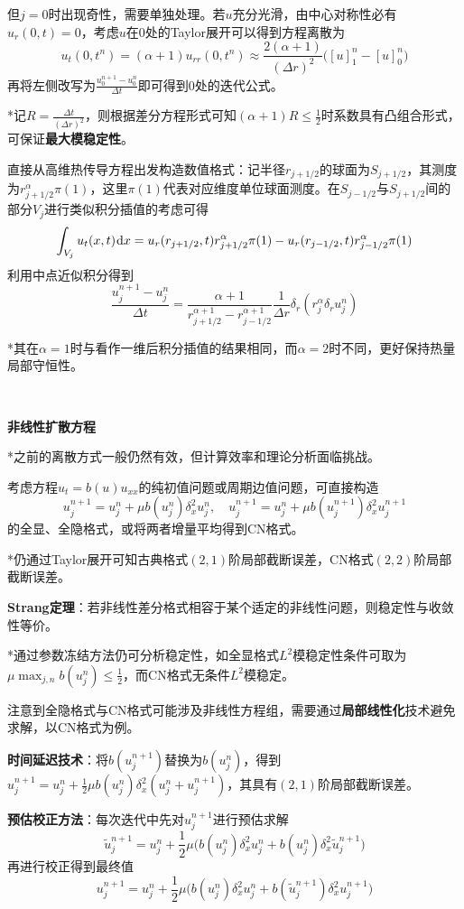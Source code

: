 \documentclass[a4paper,UTF8,fontset=windows]{ctexart}
\newcommand*{\dr}{\hspace{0.07em}\mathrm{d}}
\begin{document}
但$j=0$时出现奇性，需要单独处理。若$u$充分光滑，由中心对称性必有$u_r(0,t)=0$，考虑$u$在0处的Taylor展开可以得到方程离散为
$$u_t(0,t^n)=(\alpha+1)u_{rr}(0,t^n)\approx\frac{2(\alpha+1)}{(\Delta r)^2}\big([u]_1^n-[u]_0^n\big)$$
再将左侧改写为$\frac{u_0^{n+1}-u_0^n}{\Delta t}$即可得到0处的迭代公式。

*记$R=\frac{\Delta t}{(\Delta r)^2}$，则根据差分方程形式可知$(\alpha+1)R\le\frac{1}{2}$时系数具有凸组合形式，可保证\textbf{最大模稳定性}。

直接从高维热传导方程出发构造数值格式：记半径$r_{j+1/2}$的球面为$S_{j+1/2}$，其测度为$r_{j+1/2}^\alpha\pi(1)$，这里$\pi(1)$代表对应维度单位球面测度。在$S_{j-1/2}$与$S_{j+1/2}$间的部分$V_j$进行类似积分插值的考虑可得
$$\int_{V_j}u_t(x,t)\dr x=u_r(r_{j+1/2},t)r_{j+1/2}^\alpha\pi(1)-u_r(r_{j-1/2},t)r_{j-1/2}^\alpha\pi(1)$$
利用中点近似积分得到
$$\frac{u_j^{n+1}-u_j^n}{\Delta t}=\frac{\alpha+1}{r_{j+1/2}^{\alpha+1}-r_{j-1/2}^{\alpha+1}}\frac{1}{\Delta r}\delta_r(r_j^\alpha\delta_ru_j^n)$$

*其在$\alpha=1$时与看作一维后积分插值的结果相同，而$\alpha=2$时不同，更好保持热量局部守恒性。

\

\textbf{非线性扩散方程}

*之前的离散方式一般仍然有效，但计算效率和理论分析面临挑战。

考虑方程$u_t=b(u)u_{xx}$的纯初值问题或周期边值问题，可直接构造
$$u_j^{n+1}=u_j^n+\mu b(u_j^n)\delta_x^2u_j^n,\quad u_j^{n+1}=u_j^n+\mu b(u_j^{n+1})\delta_x^2u_j^{n+1}$$
的全显、全隐格式，或将两者增量平均得到CN格式。

*仍通过Taylor展开可知古典格式$(2,1)$阶局部截断误差，CN格式$(2,2)$阶局部截断误差。

\textbf{Strang定理}：若非线性差分格式相容于某个适定的非线性问题，则稳定性与收敛性等价。

*通过参数冻结方法仍可分析稳定性，如全显格式$L^2$模稳定性条件可取为$\mu\max_{j,n}b(u_j^n)\le\frac{1}{2}$，而CN格式无条件$L^2$模稳定。

注意到全隐格式与CN格式可能涉及非线性方程组，需要通过\textbf{局部线性化}技术避免求解，以CN格式为例。

\textbf{时间延迟技术}：将$b(u_j^{n+1})$替换为$b(u_j^n)$，得到$u_j^{n+1}=u_j^n+\frac{1}{2}\mu b(u_j^n)\delta_x^2(u_j^n+u_j^{n+1})$，其具有$(2,1)$阶局部截断误差。

\textbf{预估校正方法}：每次迭代中先对$u_j^{n+1}$进行预估求解
$$\tilde{u}_j^{n+1}=u_j^n+\frac{1}{2}\mu\big(b(u_j^n)\delta_x^2u_j^n+b(u_j^n)\delta_x^2\tilde{u}_j^{n+1}\big)$$
再进行校正得到最终值
$$u_j^{n+1}=u_j^n+\frac{1}{2}\mu\big(b(u_j^n)\delta_x^2u_j^n+b(\tilde{u}_j^{n+1})\delta_x^2u_j^{n+1}\big)$$
\end{document}
